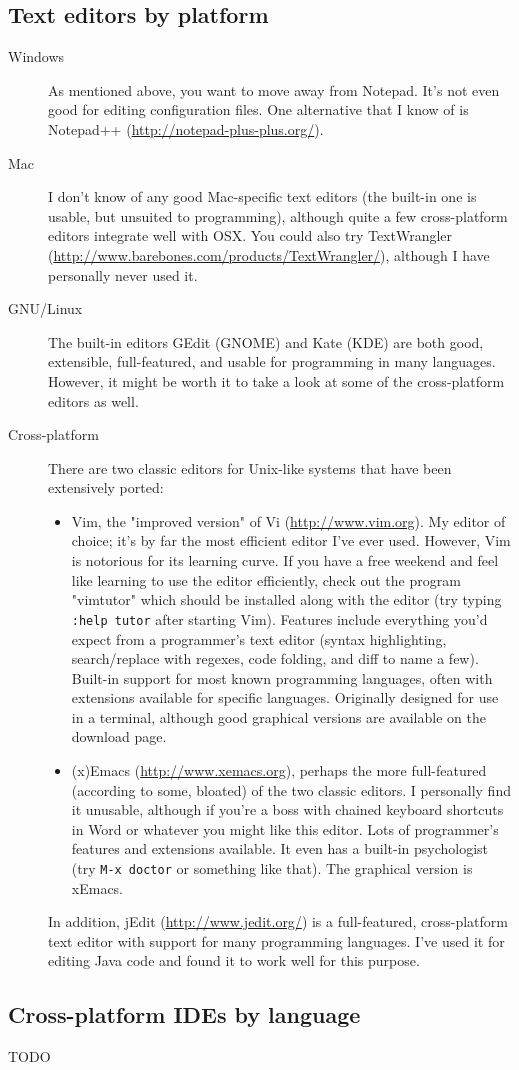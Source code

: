 \documentclass{article}
\begin{document}
\subsection{Text editors by platform}
\begin{description}
    \item[Windows] As mentioned above, you want to move away from Notepad. It's not even good for editing configuration files. One alternative that I know of is Notepad++ (\url{http://notepad-plus-plus.org/}). 
    \item[Mac] I don't know of any good Mac-specific text editors (the built-in one is usable, but unsuited to programming), although quite a few cross-platform editors integrate well with OSX. You could also try TextWrangler (\url{http://www.barebones.com/products/TextWrangler/}), although I have personally never used it.
    \item[GNU/Linux] The built-in editors GEdit (GNOME) and Kate (KDE) are both good, extensible, full-featured, and usable for programming in many languages. However, it might be worth it to take a look at some of the cross-platform editors as well.
    \item[Cross-platform] There are two classic editors for Unix-like systems that have been extensively ported: 
        \begin{itemize}
            \item Vim, the "improved version" of Vi (\url{http://www.vim.org}). My editor of choice; it's by far the most efficient editor I've ever used. However, Vim is notorious for its learning curve. If you have a free weekend and feel like learning to use the editor efficiently, check out the program "vimtutor" which should be installed along with the editor (try typing \texttt{:help tutor} after starting Vim). Features include everything you'd expect from a programmer's text editor (syntax highlighting, search/replace with regexes, code folding, and diff to name a few). Built-in support for most known programming languages, often with extensions available for specific languages. Originally designed for use in a terminal, although good graphical versions are available on the download page.
            \item (x)Emacs (\url{http://www.xemacs.org}), perhaps the more full-featured (according to some, bloated) of the two classic editors. I personally find it unusable, although if you're a boss with chained keyboard shortcuts in Word or whatever you might like this editor. Lots of programmer's features and extensions available. It even has a built-in psychologist (try \texttt{M-x doctor} or something like that). The graphical version is xEmacs.
        \end{itemize}
        In addition, jEdit (\url{http://www.jedit.org/}) is a full-featured, cross-platform text editor with support for many programming languages. I've used it for editing Java code and found it to work well for this purpose.
\end{description}

\subsection{Cross-platform IDEs by language}
TODO
\end{document}
